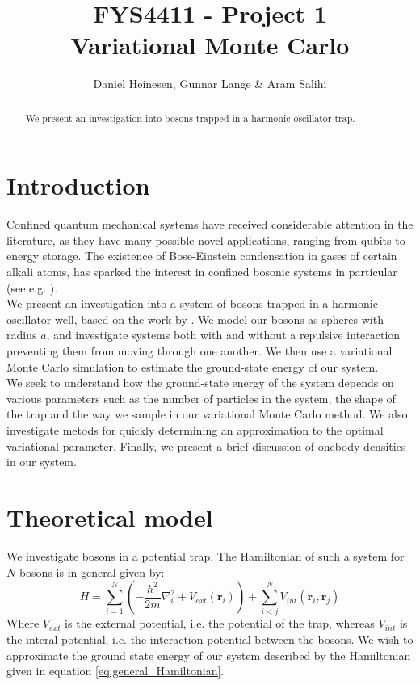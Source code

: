 \documentclass[a4paper, 10pt]{article}
\title{FYS4411 - Project 1\\
	Variational Monte Carlo}
\author{Daniel Heinesen, Gunnar Lange \& Aram Salihi}
\begin{document}
	\maketitle
	\begin{abstract}
	We present an investigation into bosons trapped in a harmonic oscillator trap. 
	\end{abstract}
	\tableofcontents
	\section{Introduction}
	Confined quantum mechanical systems have received considerable attention in the literature, as they have many possible novel applications, ranging from qubits to energy storage. The existence of Bose-Einstein condensation in gases of certain alkali atoms, has sparked the interest in confined bosonic systems in particular (see e.g. \cite{Nilsen2005}). \\
	\linebreak
	We present an investigation into a system of bosons trapped in a harmonic oscillator well, based on the work by \cite{DuBois2001}. We model our bosons as spheres with radius $a$, and investigate systems both with and without a repulsive interaction preventing them from moving through one another. We then use a variational Monte Carlo simulation to estimate the ground-state energy of our system.\\
	\linebreak
	 We seek to understand how the ground-state energy of the system depends on various parameters such as the number of particles in the system, the shape of the trap and the way we sample in our variational Monte Carlo method. We also investigate metods for quickly determining an approximation to the optimal variational parameter. Finally, we present a brief discussion of onebody densities in our system.
	\section{Theoretical model}
	We investigate bosons in a potential trap. The Hamiltonian of such a system for $N$ bosons is in general given by:
	\begin{equation} \label{eq:general_Hamiltonian}
	H=\sum_{i=1}^N\left(-\frac{\hbar^2}{2m}\nabla_i^2 +V_{ext}(\boldsymbol{r}_i)\right)+\sum_{i<j}^N V_{int}(\boldsymbol{r}_i, \boldsymbol{r}_j)
	\end{equation}
	Where $V_{ext}$ is the external potential, i.e. the potential of the trap, whereas $V_{int}$ is the interal potential, i.e. the interaction potential between the bosons. We wish to approximate the ground state energy of our system described by the Hamiltonian given in equation \ref{eq:general_Hamiltonian}.
\end{document}
